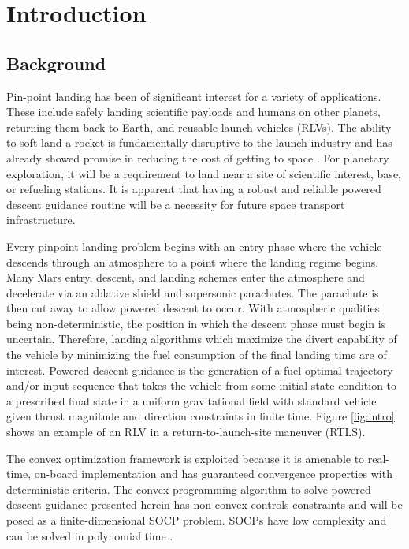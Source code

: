 \chapter{Introduction}
\label{introchap}

\section{Background}
Pin-point landing has been of significant interest for a variety of applications. These include safely landing scientific payloads and humans on other planets, returning them back to Earth, and reusable launch vehicles (RLVs). The ability to soft-land a rocket is fundamentally disruptive to the launch industry and has already showed promise in reducing the cost of getting to space \cite{jones2018recent}. For planetary exploration, it will be a requirement to land near a site of scientific interest, base, or refueling stations. It is apparent that having a robust and reliable powered descent guidance routine will be a necessity for future space transport infrastructure.

Every pinpoint landing problem begins with an entry phase where the vehicle descends through an atmosphere to a point where the landing regime begins. Many Mars entry, descent, and landing schemes enter the atmosphere and decelerate via an ablative shield and supersonic parachutes. The parachute is then cut away to allow powered descent to occur. With atmospheric qualities being non-deterministic, the position in which the descent phase must begin is uncertain. Therefore, landing algorithms which maximize the divert capability of the vehicle by minimizing the fuel consumption of the final landing time are of interest. Powered descent guidance is the generation of a fuel-optimal trajectory and/or input sequence that takes the vehicle from some initial state condition to a prescribed final state in a uniform gravitational field with standard vehicle given thrust magnitude and direction constraints in finite time. Figure \ref{fig:intro} shows an example of an RLV in a return-to-launch-site maneuver (RTLS).

The convex optimization framework is exploited because it is amenable to real-time, on-board implementation and has guaranteed convergence properties with deterministic criteria. The convex programming algorithm to solve powered descent guidance presented herein has non-convex controls constraints and will be posed as a finite-dimensional SOCP problem. SOCPs have low complexity and can be solved in polynomial time \cite{boyd2004convex}.


